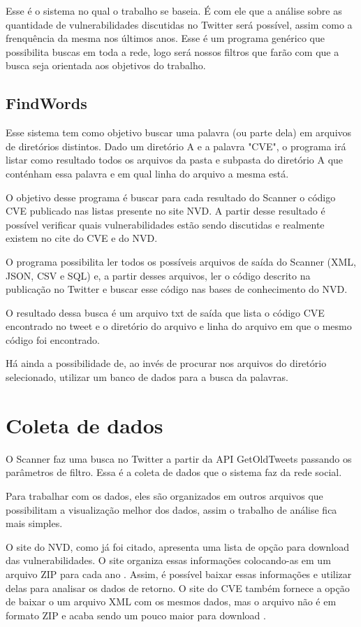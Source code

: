 Esse é o sistema no qual o trabalho se baseia. É com ele que a análise sobre as quantidade de vulnerabilidades discutidas no Twitter será possível, assim como a frenquência da mesma nos últimos anos. Esse é um programa genérico que possibilita buscas em toda a rede, logo será nossos filtros que farão com que a busca seja orientada aos objetivos do trabalho.

\subsection{FindWords}

Esse sistema tem como objetivo buscar uma palavra (ou parte dela) em arquivos de diretórios distintos. Dado um diretório A e a palavra "CVE", o programa irá listar como resultado todos os arquivos da pasta e subpasta do diretório A que conténham essa palavra e em qual linha do arquivo a mesma está. 

O objetivo desse programa é buscar para cada resultado do Scanner o código CVE publicado nas listas presente no site NVD. A partir desse resultado é possível verificar quais vulnerabilidades estão sendo discutidas e realmente existem no cite do CVE e do NVD.

O programa possibilita ler todos os possíveis arquivos de saída do Scanner (XML, JSON, CSV e SQL) e, a partir desses arquivos, ler o código descrito na publicação no Twitter e buscar esse código nas bases de conhecimento do NVD.

O resultado dessa busca é um arquivo txt de saída que lista o código CVE encontrado no tweet e o diretório do arquivo e linha do arquivo em que o mesmo código foi encontrado.

Há ainda a possibilidade de, ao invés de procurar nos arquivos do diretório selecionado, utilizar um banco de dados para a busca da palavras.

\section{Coleta de dados}

O Scanner faz uma busca no Twitter a partir da API GetOldTweets \cite{Pythoncommunity} passando os parâmetros de filtro. Essa é a coleta de dados que o sistema faz da rede social. 

Para trabalhar com os dados, eles são organizados em outros arquivos que possibilitam a visualização melhor dos dados, assim o trabalho de análise fica mais simples.

O site do NVD, como já foi citado, apresenta uma lista de opção para download das vulnerabilidades. O site organiza essas informações colocando-as em um arquivo ZIP para cada ano \cite{NISTDownload}. Assim, é possível baixar essas informações e utilizar delas para analisar os dados de retorno. O site do CVE também fornece a opção de baixar o um arquivo XML com os mesmos dados, mas o arquivo não é em formato ZIP e acaba sendo um pouco maior para download \cite{TheMITRECorporation2018}.

